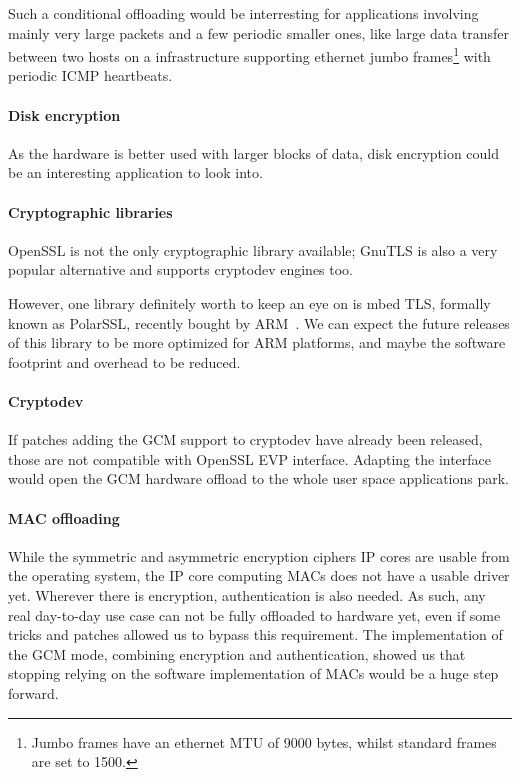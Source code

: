 Such a conditional offloading would be interresting for applications involving mainly very large packets and a few periodic smaller ones, like large data transfer between two hosts on a infrastructure supporting ethernet jumbo frames\footnote{Jumbo frames have an ethernet MTU of 9000 bytes, whilst standard frames are set to 1500.} with periodic ICMP heartbeats.

\paragraph{Disk encryption}
As the hardware is better used with larger blocks of data, disk encryption could be an interesting application to look into.

\paragraph{Cryptographic libraries}
OpenSSL is not the only cryptographic library available; GnuTLS is also a very popular alternative and supports cryptodev engines too.

However, one library definitely worth to keep an eye on is mbed TLS, formally known as PolarSSL, recently bought by ARM~\cite{2015-arm-buy-polarssl}.
We can expect the future releases of this library to be more optimized for ARM platforms, and maybe the software footprint and overhead to be reduced.


\paragraph{Cryptodev}
If patches adding the GCM support to cryptodev have already been released, those are not compatible with OpenSSL EVP interface.
Adapting the interface would open the GCM hardware offload to the whole user space applications park.

\paragraph{MAC offloading}
While the symmetric and asymmetric encryption ciphers IP cores are usable from the operating system, the IP core computing MACs does not have a usable driver yet.
Wherever there is encryption, authentication is also needed.
As such, any real day-to-day use case can not be fully offloaded to hardware yet, even if some tricks and patches allowed us to bypass this requirement.
The implementation of the GCM mode, combining encryption and authentication, showed us that stopping relying on the software implementation of MACs would be a huge step forward.





